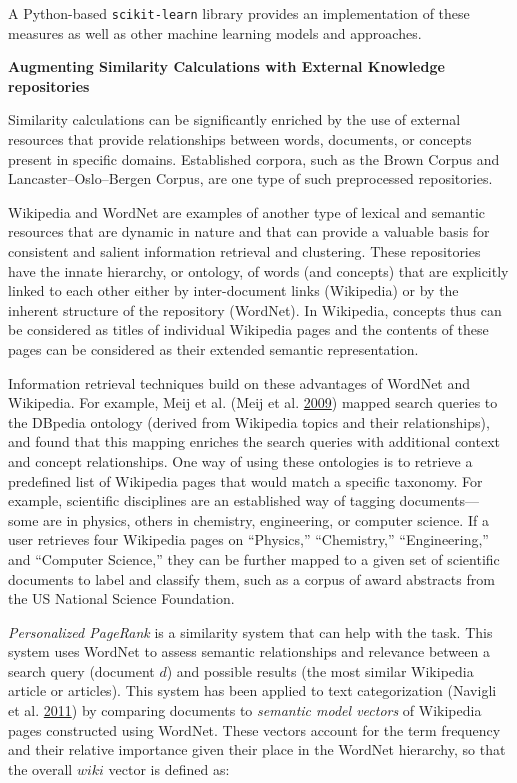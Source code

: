 \documentclass[]{krantz}
\begin{document}
A Python-based \texttt{scikit-learn} library provides an implementation
of these measures as well as other machine learning models and
approaches.

\textbf{Augmenting Similarity Calculations with External Knowledge
repositories}

Similarity calculations can be significantly enriched by the use of
external resources that provide relationships between words, documents,
or concepts present in specific domains. Established corpora, such as
the Brown Corpus and Lancaster--Oslo--Bergen Corpus, are one type of
such preprocessed repositories.

Wikipedia and WordNet are examples of another type of lexical and
semantic resources that are dynamic in nature and that can provide a
valuable basis for consistent and salient information retrieval and
clustering. These repositories have the innate hierarchy, or ontology,
of words (and concepts) that are explicitly linked to each other either
by inter-document links (Wikipedia) or by the inherent structure of the
repository (WordNet). In Wikipedia, concepts thus can be considered as
titles of individual Wikipedia pages and the contents of these pages can
be considered as their extended semantic representation.

Information retrieval techniques build on these advantages of WordNet
and Wikipedia. For example, Meij et al. (Meij et al.
\protect\hyperlink{ref-meij-09}{2009}) mapped search queries to the
DBpedia ontology (derived from Wikipedia topics and their
relationships), and found that this mapping enriches the search queries
with additional context and concept relationships. One way of using
these ontologies is to retrieve a predefined list of Wikipedia pages
that would match a specific taxonomy. For example, scientific
disciplines are an established way of tagging documents--- some are in
physics, others in chemistry, engineering, or computer science. If a
user retrieves four Wikipedia pages on ``Physics,'' ``Chemistry,''
``Engineering,'' and ``Computer Science,'' they can be further mapped to
a given set of scientific documents to label and classify them, such as
a corpus of award abstracts from the US National Science Foundation.

\emph{Personalized PageRank} is a similarity system that can help with
the task. This system uses WordNet to assess semantic relationships and
relevance between a search query (document \(d\)) and possible results
(the most similar Wikipedia article or articles). This system has been
applied to text categorization (Navigli et al.
\protect\hyperlink{ref-navigli-11}{2011}) by comparing documents to
\emph{semantic model vectors} of Wikipedia pages constructed using
WordNet. These vectors account for the term frequency and their relative
importance given their place in the WordNet hierarchy, so that the
overall \(wiki\) vector is defined as:
\end{document}
